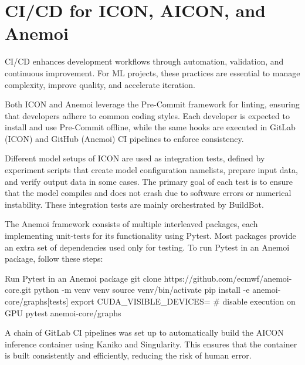 %
\section{CI/CD for ICON, AICON, and Anemoi}
CI/CD enhances development workflows through automation, validation, and continuous improvement. For ML projects, these practices are essential to manage complexity, improve quality, and accelerate iteration.

Both ICON and Anemoi leverage the Pre-Commit framework for linting, ensuring that developers adhere to common coding styles. Each developer is expected to install and use Pre-Commit offline, while the same hooks are executed in GitLab (ICON) and GitHub (Anemoi) CI pipelines to enforce consistency.

Different model setups of ICON are used as integration tests, defined by experiment scripts that create model configuration namelists, prepare input data, and verify output data in some cases. The primary goal of each test is to ensure that the model compiles and does not crash due to software errors or numerical instability. These integration tests are mainly orchestrated by BuildBot.

The Anemoi framework consists of multiple interleaved packages, each implementing unit-tests for its functionality using Pytest. Most packages provide an extra set of dependencies used only for testing. To run Pytest in an Anemoi package, follow these steps:

\begin{codeonly}{Run Pytest in an Anemoi package}
git clone https://github.com/ecmwf/anemoi-core.git
python -m venv venv
source venv/bin/activate
pip install -e anemoi-core/graphs[tests]
export CUDA_VISIBLE_DEVICES=  # disable execution on GPU
pytest anemoi-core/graphs
\end{codeonly}

A chain of GitLab CI pipelines was set up to automatically build the AICON inference container using Kaniko and Singularity. This ensures that the container is built consistently and efficiently, reducing the risk of human error.